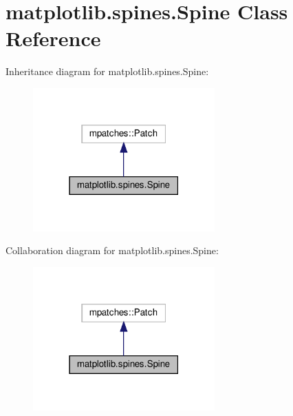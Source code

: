 \hypertarget{classmatplotlib_1_1spines_1_1Spine}{}\section{matplotlib.\+spines.\+Spine Class Reference}
\label{classmatplotlib_1_1spines_1_1Spine}


Inheritance diagram for matplotlib.\+spines.\+Spine\+:
\nopagebreak
\begin{figure}[H]
\begin{center}
\leavevmode
\includegraphics[width=198pt]{classmatplotlib_1_1spines_1_1Spine__inherit__graph}
\end{center}
\end{figure}


Collaboration diagram for matplotlib.\+spines.\+Spine\+:
\nopagebreak
\begin{figure}[H]
\begin{center}
\leavevmode
\includegraphics[width=198pt]{classmatplotlib_1_1spines_1_1Spine__coll__graph}
\end{center}
\end{figure}
